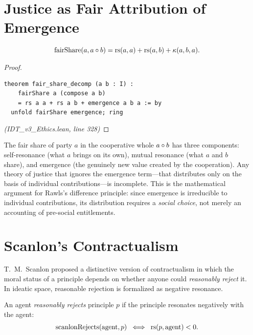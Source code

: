 \section{Justice as Fair Attribution of Emergence}

\begin{theorem}
\label{thm:fair-share-decomp}
\[
  \mathrm{fairShare}(a, a \circ b) = \mathrm{rs}(a, a) + \mathrm{rs}(a, b) + \kappa(a, b, a).
\]
\end{theorem}

\begin{proof}
\begin{lstlisting}
theorem fair_share_decomp (a b : I) :
    fairShare a (compose a b)
    = rs a a + rs a b + emergence a b a := by
  unfold fairShare emergence; ring
\end{lstlisting}
\textit{(IDT\_v3\_Ethics.lean, line 328)}
\end{proof}

\begin{interpretation}
The fair share of party $a$ in the cooperative whole $a \circ b$ has three
components: self-resonance (what $a$ brings on its own), mutual resonance
(what $a$ and $b$ share), and emergence (the genuinely new value created by
the cooperation). Any theory of justice that ignores the emergence term---that
distributes only on the basis of individual contributions---is incomplete. This
is the mathematical argument for Rawls's difference principle: since emergence
is irreducible to individual contributions, its distribution requires a
\emph{social choice}, not merely an accounting of pre-social entitlements.
\end{interpretation}

\section{Scanlon's Contractualism}
\label{sec:scanlon}

T.~M.\ Scanlon proposed a distinctive version of contractualism in which
the moral status of a principle depends on whether anyone could
\emph{reasonably reject} it. In ideatic space, reasonable rejection is
formalized as negative resonance.

\begin{definition}
\label{def:scanlon-rejects}
An agent \emph{reasonably rejects} principle $p$ if the principle resonates
negatively with the agent:
\[
  \mathrm{scanlonRejects}(\mathrm{agent}, p) \;\iff\; \mathrm{rs}(p, \mathrm{agent}) < 0.
\]
\end{definition}

